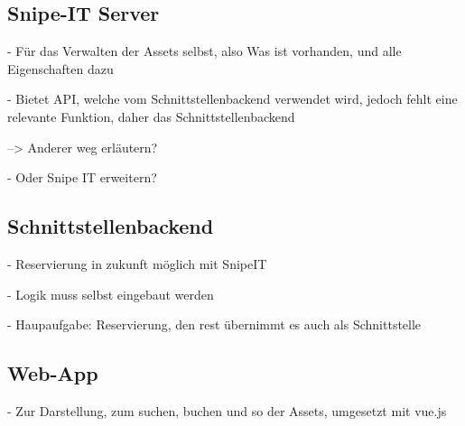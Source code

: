 \subsection{Snipe-IT Server}
- Für das Verwalten der Assets selbst, also Was ist vorhanden, und alle
Eigenschaften dazu

- Bietet API, welche vom Schnittstellenbackend verwendet wird, jedoch fehlt eine
relevante Funktion, daher das Schnittstellenbackend

--> Anderer weg erläutern?

- Oder Snipe IT erweitern?

\subsection{Schnittstellenbackend}
- Reservierung in zukunft möglich mit SnipeIT

- Logik muss selbst eingebaut werden

- Haupaufgabe: Reservierung, den rest übernimmt es auch als Schnittstelle

\subsection{Web-App}
- Zur Darstellung, zum suchen, buchen und so der Assets, umgesetzt mit vue.js

